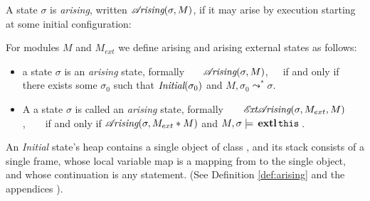 {A state $\sigma$ is \emph{arising},}  written $\mathcal{A}\!\textit{rising}(\sigma, M)$, {if it  may arise}  %
by execution
starting at some initial configuration:


\begin{definition}
\label{def:arising}
For modules $M$ and $M_{ext}$ we define arising and arising external states as follows:

\begin{itemize}
\item
 a state $\sigma$ is 
{ an \emph{arising} state, formally \ \ \  $\mathcal{A}\!\textit{rising}(\sigma, M)$,\ \ \ 
if and only if there exists some $\sigma_0$ such that $\textit{Initial}(\sigma_0)$ and
$M, {\sigma_0} \leadsto^* {\sigma}$.}
\item
{A a state $\sigma$ is 
called an \emph{arising} state, formally\ \ \ \  ${\mathcal{E}\!\textit{xt}\mathcal{A}\!\textit{rising}(\sigma, M_{ext}, M)}$,\ \ \ \
if and only if $\mathcal{A}\!\textit{rising}(\sigma, M_{ext}*M)$ and $M, \sigma \models \external{}$.}
\end{itemize}
\end{definition}


An \emph{Initial} state's heap contains a single object of class , and
its  stack   consists of a single frame, whose local variable map is a
mapping from \prg{this} to the single object, and whose continuation is  any statement.
(See Definition %
\ref{def:arising} and the 
{appendices %
\cite{necessityFull}).}




